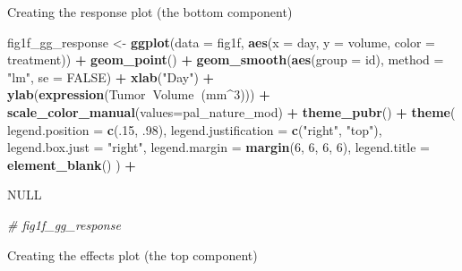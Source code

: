 \documentclass[]{book}
\newenvironment{Shaded}{\begin{snugshade}}{\end{snugshade}}
\newcommand{\CommentTok}[1]{\textcolor[rgb]{0.56,0.35,0.01}{\textit{#1}}}
\newcommand{\DataTypeTok}[1]{\textcolor[rgb]{0.13,0.29,0.53}{#1}}
\newcommand{\DecValTok}[1]{\textcolor[rgb]{0.00,0.00,0.81}{#1}}
\newcommand{\FloatTok}[1]{\textcolor[rgb]{0.00,0.00,0.81}{#1}}
\newcommand{\KeywordTok}[1]{\textcolor[rgb]{0.13,0.29,0.53}{\textbf{#1}}}
\newcommand{\NormalTok}[1]{#1}
\newcommand{\OperatorTok}[1]{\textcolor[rgb]{0.81,0.36,0.00}{\textbf{#1}}}
\newcommand{\OtherTok}[1]{\textcolor[rgb]{0.56,0.35,0.01}{#1}}
\newcommand{\StringTok}[1]{\textcolor[rgb]{0.31,0.60,0.02}{#1}}
\begin{document}
Creating the response plot (the bottom component)

\begin{Shaded}
\begin{Highlighting}[]
\NormalTok{fig1f_gg_response <-}\StringTok{ }\KeywordTok{ggplot}\NormalTok{(}\DataTypeTok{data =}\NormalTok{ fig1f,}
                      \KeywordTok{aes}\NormalTok{(}\DataTypeTok{x =}\NormalTok{ day, }\DataTypeTok{y =}\NormalTok{ volume, }\DataTypeTok{color =}\NormalTok{ treatment)) }\OperatorTok{+}
\StringTok{  }\KeywordTok{geom_point}\NormalTok{() }\OperatorTok{+}
\StringTok{  }\KeywordTok{geom_smooth}\NormalTok{(}\KeywordTok{aes}\NormalTok{(}\DataTypeTok{group =}\NormalTok{ id), }\DataTypeTok{method =} \StringTok{"lm"}\NormalTok{, }\DataTypeTok{se =} \OtherTok{FALSE}\NormalTok{) }\OperatorTok{+}
\StringTok{  }\KeywordTok{xlab}\NormalTok{(}\StringTok{"Day"}\NormalTok{) }\OperatorTok{+}
\StringTok{  }\KeywordTok{ylab}\NormalTok{(}\KeywordTok{expression}\NormalTok{(Tumor}\OperatorTok{~}\NormalTok{Volume}\OperatorTok{~}\NormalTok{(mm}\OperatorTok{^}\DecValTok{3}\NormalTok{))) }\OperatorTok{+}
\StringTok{  }\KeywordTok{scale_color_manual}\NormalTok{(}\DataTypeTok{values=}\NormalTok{pal_nature_mod) }\OperatorTok{+}
\StringTok{  }\KeywordTok{theme_pubr}\NormalTok{() }\OperatorTok{+}
\StringTok{  }\KeywordTok{theme}\NormalTok{(}
    \DataTypeTok{legend.position =} \KeywordTok{c}\NormalTok{(.}\DecValTok{15}\NormalTok{, }\FloatTok{.98}\NormalTok{),}
    \DataTypeTok{legend.justification =} \KeywordTok{c}\NormalTok{(}\StringTok{"right"}\NormalTok{, }\StringTok{"top"}\NormalTok{),}
    \DataTypeTok{legend.box.just =} \StringTok{"right"}\NormalTok{,}
    \DataTypeTok{legend.margin =} \KeywordTok{margin}\NormalTok{(}\DecValTok{6}\NormalTok{, }\DecValTok{6}\NormalTok{, }\DecValTok{6}\NormalTok{, }\DecValTok{6}\NormalTok{),}
    \DataTypeTok{legend.title =} \KeywordTok{element_blank}\NormalTok{()}
\NormalTok{    ) }\OperatorTok{+}

\StringTok{  }\OtherTok{NULL}

\CommentTok{# fig1f_gg_response}
\end{Highlighting}
\end{Shaded}

Creating the effects plot (the top component)
\end{document}
